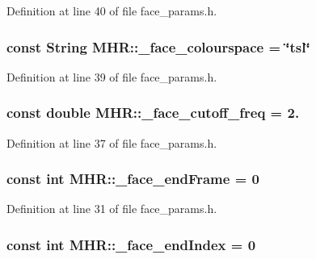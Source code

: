 Definition at line 40 of file face\+\_\+params.\+h.

\hypertarget{namespace_m_h_r_a2c3d7c5df37d2106e5f4351ebeb44c2f}{
\subsubsection[{\+\_\+face\+\_\+colourspace}]{\setlength{\rightskip}{0pt plus 5cm}const String M\+H\+R\+::\+\_\+face\+\_\+colourspace = \char`\"{}tsl\char`\"{}}}\label{namespace_m_h_r_a2c3d7c5df37d2106e5f4351ebeb44c2f}


Definition at line 39 of file face\+\_\+params.\+h.

\hypertarget{namespace_m_h_r_afc5d67d6a0c4929f2fc30dce703740fe}{
\subsubsection[{\+\_\+face\+\_\+cutoff\+\_\+freq}]{\setlength{\rightskip}{0pt plus 5cm}const double M\+H\+R\+::\+\_\+face\+\_\+cutoff\+\_\+freq = 2.}}\label{namespace_m_h_r_afc5d67d6a0c4929f2fc30dce703740fe}


Definition at line 37 of file face\+\_\+params.\+h.

\hypertarget{namespace_m_h_r_a349e142bd15540a9d0b5b63f426fc3dc}{
\subsubsection[{\+\_\+face\+\_\+end\+Frame}]{\setlength{\rightskip}{0pt plus 5cm}const int M\+H\+R\+::\+\_\+face\+\_\+end\+Frame = 0}}\label{namespace_m_h_r_a349e142bd15540a9d0b5b63f426fc3dc}


Definition at line 31 of file face\+\_\+params.\+h.

\hypertarget{namespace_m_h_r_ad45b2867da1e1b69dee3648585a3ad3a}{
\subsubsection[{\+\_\+face\+\_\+end\+Index}]{\setlength{\rightskip}{0pt plus 5cm}const int M\+H\+R\+::\+\_\+face\+\_\+end\+Index = 0}}\label{namespace_m_h_r_ad45b2867da1e1b69dee3648585a3ad3a}


